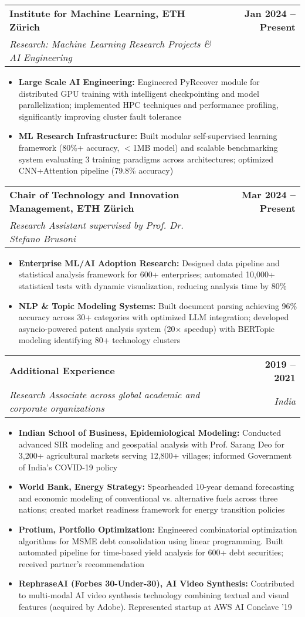 \documentclass[letterpaper,10pt]{article}
\makeatletter
\newcommand{\resumeItem}[1]{
  \item\small{
    {#1 \vspace{-2pt}}
  }
}
\newcommand{\resumeSubheading}[4]{
  \vspace{-2pt}\item
    \begin{tabular*}{1.0\textwidth}[t]{l@{\extracolsep{\fill}}r}
      \textbf{#1} & \textbf{\small #2} \\
      \textcolor{accentblue}{\textit{\small#3}} & \textit{\small #4} \\
    \end{tabular*}\vspace{-7pt}
}
\newcommand{\resumeItemListStart}{\begin{itemize}}
\newcommand{\resumeItemListEnd}{\end{itemize}\vspace{-5pt}}
\makeatother
\begin{document}
        \resumeSubheading
      {Institute for Machine Learning, ETH Zürich}{Jan 2024 -- Present}
      {Research: Machine Learning Research Projects \& AI Engineering}{}
            \resumeItemListStart
                \resumeItem{\textbf{Large Scale AI Engineering:} Engineered PyRecover module for distributed GPU training with intelligent checkpointing and model parallelization; implemented HPC techniques and performance profiling, significantly improving cluster fault tolerance}
                \resumeItem{\textbf{ML Research Infrastructure:} Built modular self-supervised learning framework (80\%+ accuracy, $<$1MB model) and scalable benchmarking system evaluating 3 training paradigms across architectures; optimized CNN+Attention pipeline (79.8\% accuracy)}
            \resumeItemListEnd

        \resumeSubheading
      {Chair of Technology and Innovation Management, ETH Zürich}{Mar 2024 -- Present}
      {Research Assistant supervised by Prof. Dr. Stefano Brusoni}{}
            \resumeItemListStart
                \resumeItem{\textbf{Enterprise ML/AI Adoption Research:} Designed data pipeline and statistical analysis framework for 600+ enterprises; automated 10,000+ statistical tests with dynamic visualization, reducing analysis time by 80\%}
                \resumeItem{\textbf{NLP \& Topic Modeling Systems:} Built document parsing achieving 96\% accuracy across 30+ categories with optimized LLM integration; developed asyncio-powered patent analysis system (20× speedup) with BERTopic modeling identifying 80+ technology clusters}
      \resumeItemListEnd

    \resumeSubheading
          {Additional Experience}{2019 -- 2021}
          {Research Associate across global academic and corporate organizations}{India}
          \resumeItemListStart
          \resumeItem{\textbf{Indian School of Business, Epidemiological Modeling:} Conducted advanced SIR modeling and geospatial analysis with Prof. Sarang Deo for 3,200+ agricultural markets serving 12,800+ villages; informed Government of India's COVID-19 policy}
          \resumeItem{\textbf{World Bank, Energy Strategy:} Spearheaded 10-year demand forecasting and economic modeling of conventional vs. alternative fuels across three nations; created market readiness framework for energy transition policies}
          \resumeItem{\textbf{Protium, Portfolio Optimization:} Engineered combinatorial optimization algorithms for MSME debt consolidation using linear programming. Built automated pipeline for time-based yield analysis for 600+ debt securities; received partner's recommendation}
          \resumeItem{\textbf{RephraseAI (Forbes 30-Under-30), AI Video Synthesis:} Contributed to multi-modal AI video synthesis technology combining textual and visual features (acquired by Adobe). Represented startup at AWS AI Conclave '19}
          \resumeItemListEnd
\end{document}
